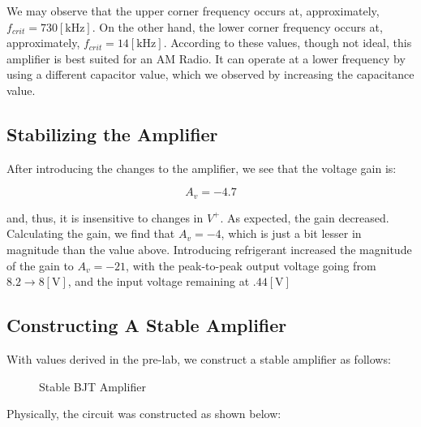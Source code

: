 \documentclass[
	letterpaper, %
	10pt, %
]{CSUniSchoolLabReport}
\begin{document}
We may observe that the upper corner frequency occurs at, approximately, $f_{crit}=730[\si{\kilo\hertz}]$. On the other hand, the lower corner frequency occurs at, approximately, $f_{crit}=14[\si{\kilo\hertz}]$. According to these values, though not ideal, this amplifier is best suited for an AM Radio. It can operate at a lower frequency by using a different capacitor value, which we observed by increasing the capacitance value.

\subsection{Stabilizing the Amplifier}

After introducing the changes to the amplifier, we see that the voltage gain is:

$$A_v=-4.7$$

and, thus, it is insensitive to changes in $V^+$. As expected, the gain decreased. Calculating the gain, we find that $A_v=-4$, which is just a bit lesser in magnitude than the value above. Introducing refrigerant increased the magnitude of the gain to $A_v=-21$, with the peak-to-peak output voltage going from $8.2\to8[\si{\volt}]$, and the input voltage remaining at $.44[\si{\volt}]$

\subsection{Constructing A Stable Amplifier}

With values derived in the pre-lab, we construct a stable amplifier as follows:

\begin{figure}[H]
  \centering
  
  \caption{Stable BJT Amplifier}
  \label{fig:3}
\end{figure}

Physically, the circuit was constructed as shown below:
\end{document}
